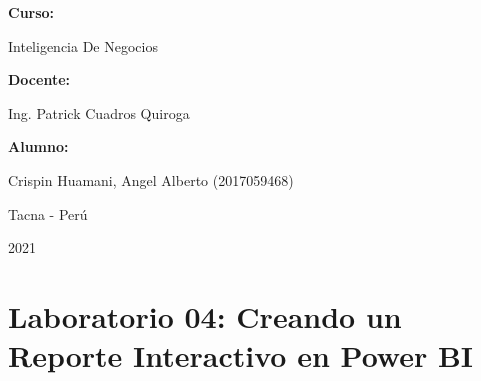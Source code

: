 \documentclass[12pt,letterpaper]{article}
\begin{document}
\begin{titlepage}
\begin{center}
\vspace*{0.3in}
\begin{Large}
\textbf{Curso:} \\
\end{Large}

\vspace*{0.1in}
\begin{large}
    Inteligencia De Negocios\\
\end{large}

\vspace*{0.3in}
\begin{Large}
\textbf{Docente:} \\
\end{Large}

\vspace*{0.1in}
\begin{large}
Ing. Patrick Cuadros Quiroga\\
\end{large}

\vspace*{0.2in}
\vspace*{0.1in}
\begin{large}
\textbf{Alumno:} \\
\begin{flushleft}
    Crispin Huamani, Angel Alberto		\hfill	(2017059468) \\


\end{flushleft}
\end{large}
\vspace*{0.1in}
\begin{large}
Tacna - Perú\\
\end{large}
\vspace*{0.1in}
\begin{large}
2021\\
\end{large}

\end{center}

\end{titlepage}




\thispagestyle{empty} %
\newpage
\setcounter{page}{1} %



\section*{Laboratorio 04: Creando un Reporte Interactivo en Power BI}
\end{document}
